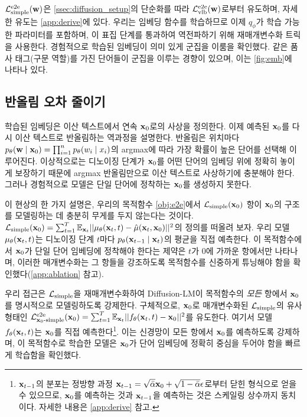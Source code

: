 $ \mathcal{L}^\text{e2e}_\text{simple} (\mathbf{w})$은 \cref{ssec:diffusion_setup}의 단순화를 따라 $\mathcal{L}^\text{e2e}_{\text{vlb}}(\mathbf{w})$로부터 유도하며, 자세한 유도는 \cref{app:derive}에 있다. 우리는 임베딩 함수를 학습하므로 이제 $q_\phi$가 학습 가능한 파라미터를 포함하며, 이 표집 단계를 통과하여 역전파하기 위해 재매개변수화 트릭 \citep{rezende2014stochastic, kingma2014auto}을 사용한다.
경험적으로 학습된 임베딩이 의미 있게 군집을 이룸을 확인했다. 같은 품사 태그(구문 역할)를 가진 단어들이 군집을 이루는 경향이 있으며, 이는 \cref{fig:emb}에 나타나 있다.



\subsection{반올림 오차 줄이기}
\label{ssec:rounding}


학습된 임베딩은 이산 텍스트에서 연속 $\mathbf{x}_{0}$로의 사상을 정의한다. 이제 예측된 $\mathbf{x}_{0}$를 다시 이산 텍스트로 반올림하는 역과정을 설명한다. 반올림은 위치마다 $p_\theta(\mathbf{w} \mid \mathbf{x}_{0})= \prod_{i=1}^n p_\theta(w_i \mid x_i)$의 argmax에 따라 가장 확률이 높은 단어를 선택해 이루어진다. 이상적으로는 디노이징 단계가 $\mathbf{x}_{0}$를 어떤 단어의 임베딩 위에 정확히 놓이게 보장하기 때문에 argmax 반올림만으로 이산 텍스트로 사상하기에 충분해야 한다. 그러나 경험적으로 모델은 단일 단어에 정착하는 $\mathbf{x}_{0}$를 생성하지 못한다.



이 현상의 한 가지 설명은, 우리의 목적함수 \ref{obj:e2e}에서 $\mathcal{L}_\text{simple}(\mathbf{x}_{0})$ 항이 $\mathbf{x}_{0}$의 구조를 모델링하는 데 충분히 무게를 두지 않는다는 것이다. $\mathcal{L}_\text{simple}(\mathbf{x}_{0}) =\sum_{t=1}^T \mathbb{E}_{\mathbf{x}_{t}}|| \mu_\theta(\mathbf{x}_{t}, t) - \hat{\mu}(\mathbf{x}_{t}, \mathbf{x}_{0}) ||^2$의 정의를 떠올려 보자. 우리 모델 $\mu_\theta(\mathbf{x}_{t}, t)$는 디노이징 단계 $t$마다 $p_\theta(\mathbf{x}_{t-1}\mid \mathbf{x}_{t})$의 평균을 직접 예측한다.
이 목적함수에서 $\mathbf{x}_{0}$가 단일 단어 임베딩에 정착해야 한다는 제약은 $t$가 0에 가까운 항에서만 나타나며, 이러한 매개변수화는 그 항들을 강조하도록 목적함수를 신중하게 튜닝해야 함을 확인했다(\cref{app:ablation} 참고).


\newcommand{\Lsimplexx}{\mathcal{L}^\text{e2e}_{\cx{0}\text{-simple}}}
우리 접근은 $\mathcal{L}_\text{simple}$을 재매개변수화하여 Diffusion-LM이 목적함수의 \emph{모든} 항에서 $\mathbf{x}_{0}$를 명시적으로 모델링하도록 강제한다. 구체적으로, $\mathbf{x}_{0}$로 매개변수화된 $\mathcal{L}_\text{simple}$의 유사 형태인 $\Lsimplexx(\cx{0})=\sum_{t=1}^T \mathbb{E}_{\cx{t}} ||\xxtheta(\cx{t}, t) - \cx{0} ||^2$를 유도한다. 여기서 모델 $f_\theta(\mathbf{x}_{t}, t)$는 $\mathbf{x}_{0}$를 직접 예측한다\footnote{$\mathbf{x}_{t-1}$의 분포는 정방향 과정 $\mathbf{x}_{t-1} = \sqrt{\bar{\alpha}} \mathbf{x}_{0} +\sqrt{1-\bar{\alpha}} \epsilon$로부터 닫힌 형식으로 얻을 수 있으므로, $\mathbf{x}_{0}$를 예측하는 것과 $\mathbf{x}_{t-1}$을 예측하는 것은 스케일링 상수까지 동치이다. 자세한 내용은 \cref{app:derive} 참고.}. 이는 신경망이 모든 항에서 $\mathbf{x}_{0}$를 예측하도록 강제하며, 이 목적함수로 학습한 모델은 $\mathbf{x}_{0}$가 단어 임베딩에 정확히 중심을 두어야 함을 빠르게 학습함을 확인했다.

